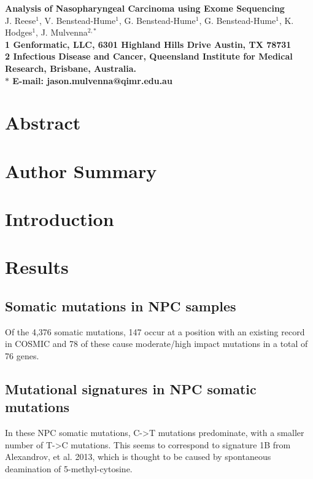 \documentclass[10pt]{article}
\date{}
\begin{document}
\begin{flushleft}
{\Large
\textbf{Analysis of Nasopharyngeal Carcinoma using Exome Sequencing}
}
\\
J. Reese$^{1}$, 
V. Benstead-Hume$^{1}$, 
G. Benstead-Hume$^{1}$,
G. Benstead-Hume$^{1}$,
K. Hodges$^{1}$,
J. Mulvenna$^{2,\ast}$
\\
\bf{1} Genformatic, LLC, 6301 Highland Hills Drive Austin, TX 78731
\\
\bf{2} Infectious Disease and Cancer, Queensland Institute for Medical Research, Brisbane, Australia.
\\
$\ast$ E-mail: jason.mulvenna@qimr.edu.au
\end{flushleft}

\section*{Abstract}

\section*{Author Summary}

\section*{Introduction}

\section*{Results}

\subsection*{Somatic mutations in NPC samples}
Of the 4,376 somatic mutations, 147 occur at a position with an existing record in COSMIC and 78 of these cause moderate/high impact mutations in a total of 76 genes.

\subsection*{Mutational signatures in NPC somatic mutations}
In these NPC somatic mutations, C->T mutations predominate, with a smaller number of T->C mutations. This seems to correspond to signature 1B from Alexandrov, et al. 2013, which is thought to be caused by spontaneous deamination of 5-methyl-cytosine.
\end{document}
